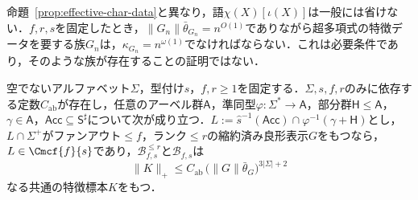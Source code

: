 命題~\ref{prop:effective-char-data}と異なり，語$\chi(X)[\iota(X)]$は一般には省けない．$f,r,s$を固定したとき，$\|G_n\|\bar\theta_{G_n}=n^{O(1)}$でありながら超多項式の特徴データを要する族$G_n$は，$\kappa_{G_n}=n^{\omega(1)}$でなければならない．これは必要条件であり，そのような族が存在することの証明ではない．

\begin{theorem}[アーベル型フィルタ付き標的の多項式データ]
\label{thm:mcfg-abelian-filter-data}
空でないアルファベット$\Sigma$，型付け$s$，$f,r\ge1$を固定する．$\Sigma,s,f,r$のみに依存する定数$C_{\mathrm{ab}}$が存在し，任意のアーベル群$\mathsf A$，準同型$\varphi:\Sigma^*\to\mathsf A$，部分群$\mathsf H\le\mathsf A$，$\gamma\in\mathsf A$，$\mathsf{Acc}\subseteq\mathsf S^\sharp$について次が成り立つ．$L:=\widehat s^{-1}(\mathsf{Acc})\cap\varphi^{-1}(\gamma+\mathsf H)$とし，$L\cap\Sigma^+$がファンアウト$\le f$，ランク$\le r$の縮約済み良形表示$G$をもつなら，$L\in\Cmcf{f}{s}$であり，$\mathcal B^{\le r}_{f,s}$と$\mathcal B_{f,s}$は
\[
 \|K\|_+\le C_{\mathrm{ab}}\,\bigl(\|G\|\bar\theta_G\bigr)^{3|\Sigma|+2}
\]
なる共通の特徴標本$K$をもつ．
\end{theorem}

